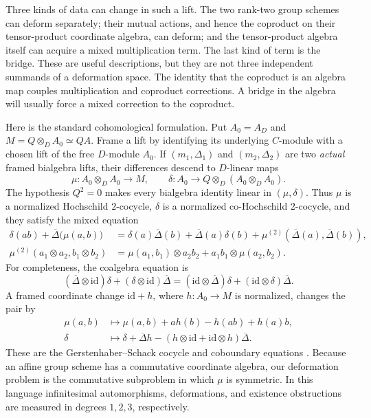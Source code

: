 \documentclass[11pt]{amsart}
\theoremstyle{definition}
\theoremstyle{remark}
\newcommand{\ot}{\otimes}
\newcommand{\id}{\mathrm{id}}
\begin{document}
Three kinds of data can change in such a lift.  The two rank-two group
schemes can deform separately; their mutual actions, and hence the
coproduct on their tensor-product coordinate algebra, can deform; and the
tensor-product algebra itself can acquire a mixed multiplication term.
The last kind of term is the bridge.  These are useful descriptions, but
they are not three independent summands of a deformation space.  The
identity that the coproduct is an algebra map couples multiplication and
coproduct corrections.  A bridge in the algebra will usually force a
mixed correction to the coproduct.

Here is the standard cohomological formulation.  Put \(A_0=A_D\) and
\(M=Q\ot_DA_0\simeq QA\).  Frame a lift by identifying its underlying
\(C\)-module with a chosen lift of the free \(D\)-module \(A_0\).  If
\((m_1,\Delta_1)\) and \((m_2,\Delta_2)\) are two \emph{actual} framed
bialgebra lifts, their differences descend to \(D\)-linear maps
\[
 \mu\colon A_0\ot_DA_0\longrightarrow M,
 \qquad
 \delta\colon A_0\longrightarrow
 Q\ot_D(A_0\ot_DA_0).
\]
The hypothesis \(Q^2=0\) makes every bialgebra identity linear in
\((\mu,\delta)\).  Thus \(\mu\) is a normalized Hochschild \(2\)-cocycle,
\(\delta\) is a normalized co-Hochschild \(2\)-cocycle, and they satisfy
the mixed equation
\begin{align}
 \delta(ab)+\overline\Delta\bigl(\mu(a,b)\bigr)
 &=
 \delta(a)\overline\Delta(b)
 +\overline\Delta(a)\delta(b)
 +\mu^{(2)}(\overline\Delta(a),\overline\Delta(b)),
 \label{eq:GS-mixed}
\\[-2pt]
 \mu^{(2)}(a_1\ot a_2,b_1\ot b_2)
 &=
 \mu(a_1,b_1)\ot a_2b_2
 +a_1b_1\ot\mu(a_2,b_2).
 \nonumber
\end{align}
For completeness, the coalgebra equation is
\begin{equation}\label{eq:GS-coalgebra}
 (\overline\Delta\ot\id)\delta
 +(\delta\ot\id)\overline\Delta
 =
 (\id\ot\overline\Delta)\delta
 +(\id\ot\delta)\overline\Delta .
\end{equation}
A framed coordinate change \(\id+h\), where
\(h\colon A_0\to M\) is normalized, changes the pair by
\begin{align}
 \mu(a,b)&\longmapsto
 \mu(a,b)+a h(b)-h(ab)+h(a)b,\label{eq:GS-gauge-m}\\
 \delta&\longmapsto
 \delta+\overline\Delta h
 -(h\ot\id+\id\ot h)\overline\Delta .
 \label{eq:GS-gauge-d}
\end{align}
These are the Gerstenhaber--Schack cocycle and coboundary equations
\cite{GerstenhaberSchack}.  Because an affine group scheme has a
commutative coordinate algebra, our deformation problem is the
commutative subproblem in which \(\mu\) is symmetric.  In this language
infinitesimal automorphisms, deformations, and existence obstructions are
measured in degrees \(1,2,3\), respectively.
\end{document}
